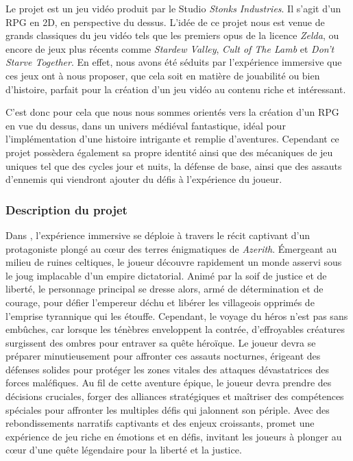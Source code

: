 
\vspace*{0.2cm}

Le projet \textit{\gameName} est un jeu vidéo produit par le Studio \textit{Stonks Industries}. Il s’agit d’un RPG en 2D, en perspective du dessus. L’idée de ce projet nous est venue de grands classiques du jeu vidéo tels que les premiers opus de la licence \textit{Zelda}, ou encore de jeux plus récents comme \textit{Stardew Valley}, \textit{Cult of The Lamb} et \textit{Don’t Starve Together}. En effet, nous avons été séduits par l'expérience immersive que ces jeux ont à nous proposer, que cela soit en matière de jouabilité ou bien d’histoire, parfait pour la création d’un jeu vidéo au contenu riche et intéressant. 

C’est donc pour cela que nous nous sommes orientés vers la création d’un RPG en vue du dessus, dans un univers médiéval fantastique, idéal pour l’implémentation d’une histoire intrigante et remplie d’aventures. Cependant ce projet possèdera également sa propre identité ainsi que des mécaniques de jeu uniques tel que des cycles jour et nuits, la défense de base, ainsi que des assauts d’ennemis qui viendront ajouter du défis à l'expérience du joueur.

\subsubsection*{\hspace*{0.6cm}Description du projet}

Dans \textit{\gameName}, l'expérience immersive se déploie à travers le récit captivant d'un protagoniste plongé au cœur des terres énigmatiques de \textit{Azerith}. Émergeant au milieu de ruines celtiques, le joueur découvre rapidement un monde asservi sous le joug implacable d'un empire dictatorial. Animé par la soif de justice et de liberté, le personnage principal se dresse alors, armé de détermination et de courage, pour défier l'empereur déchu et libérer les villageois opprimés de l'emprise tyrannique qui les étouffe.
Cependant, le voyage du héros n'est pas sans embûches, car lorsque les ténèbres enveloppent la contrée, d'effroyables créatures surgissent des ombres pour entraver sa quête héroïque. Le joueur devra se préparer minutieusement pour affronter ces assauts nocturnes, érigeant des défenses solides pour protéger les zones vitales des attaques dévastatrices des forces maléfiques.
Au fil de cette aventure épique, le joueur devra prendre des décisions cruciales, forger des alliances stratégiques et maîtriser des compétences spéciales pour affronter les multiples défis qui jalonnent son périple. Avec des rebondissements narratifs captivants et des enjeux croissants, \textit{\gameName} promet une expérience de jeu riche en émotions et en défis, invitant les joueurs à plonger au cœur d'une quête légendaire pour la liberté et la justice.


